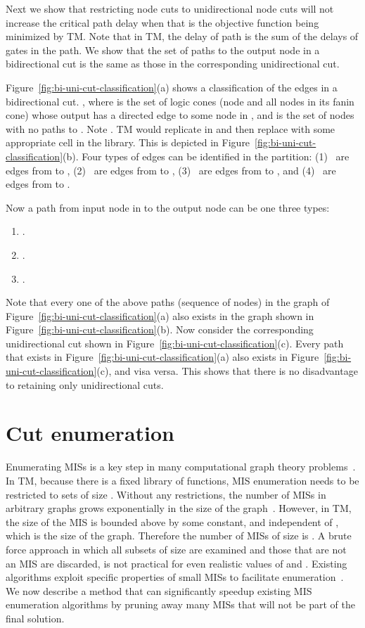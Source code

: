 \documentclass[journal]{IEEEtran}
\begin{document}
Next we show that restricting node cuts to unidirectional node cuts will not increase the critical path delay when that is the objective function being minimized by TM.  Note that in TM, the delay of  path is the sum of the delays of gates in the path. We show that the set of paths to the output node   in a bidirectional cut is the same as those in the corresponding unidirectional cut. 

Figure~\ref{fig:bi-uni-cut-classification}(a) shows a classification of the edges in a bidirectional cut.  , where  is the set of logic cones (node and all nodes in its fanin cone) whose output has a directed edge to some node in , and  is the set of nodes with no paths to .  Note .  TM would replicate  in  and then replace  with some appropriate cell in the library.  This is depicted in Figure~\ref{fig:bi-uni-cut-classification}(b).  Four types of edges can be identified in the  partition: (1)~ are edges from  to , (2)~ are edges from  to , (3)~ are edges from  to , and (4)~ are edges from  to . 

Now a path from input node in  to the output node  can be one three types: 
\begin{enumerate}
\item .
\item . 
\item . 
\end{enumerate}
Note that every one of the above paths (sequence of nodes) in the graph of Figure~\ref{fig:bi-uni-cut-classification}(a) also exists in the graph shown in Figure~\ref{fig:bi-uni-cut-classification}(b). Now consider the corresponding unidirectional cut shown in Figure~\ref{fig:bi-uni-cut-classification}(c). Every path that exists in Figure~\ref{fig:bi-uni-cut-classification}(a) also exists in Figure~\ref{fig:bi-uni-cut-classification}(c), and visa versa. This shows that there is no disadvantage to retaining only unidirectional cuts. 



\section{Cut enumeration}

Enumerating MISs is a key step in many computational graph theory problems~\cite{eppstein2001small,byskov2003algorithms,byskov2004enumerating}.  In TM, because there is a fixed library of functions, MIS enumeration needs to be restricted to sets of size .  Without any restrictions, the number of MISs in arbitrary graphs grows exponentially in the size of the graph~\cite{byskov2004enumerating}.  However, in TM, the size  of the MIS is bounded above by some constant, and independent of , which is the size of the graph. Therefore the number of MISs of size  is .  A brute force approach in which all subsets of size  are examined and those that are not an MIS are discarded, is not practical for even realistic values of  and . Existing algorithms exploit specific properties of small MISs to facilitate enumeration~\cite{eppstein2001small}. We now describe a method that can significantly speedup existing MIS enumeration algorithms by  pruning away many MISs that will not be part of the final solution. 
\end{document}
